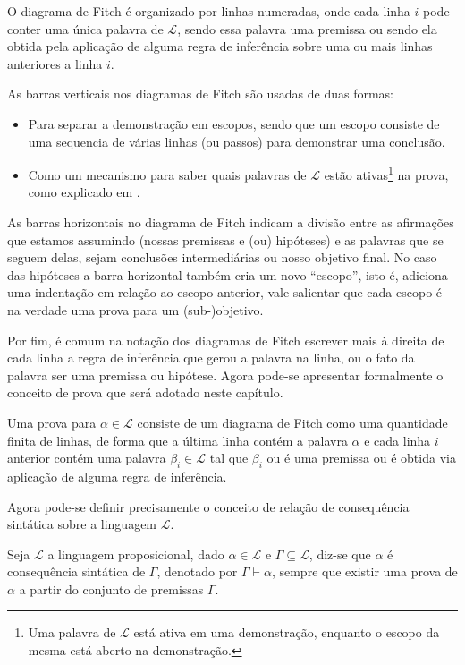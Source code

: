 O diagrama de Fitch é organizado por linhas numeradas, onde cada linha $i$ pode conter uma única palavra de $\mathcal{L}$, sendo essa palavra uma premissa ou sendo ela obtida pela aplicação de alguma regra de inferência sobre uma ou mais linhas anteriores a linha $i$. 

As barras verticais nos diagramas de Fitch são usadas de duas formas:
\begin{itemize}
    \item[(1)] Para separar a demonstração em escopos, sendo que um escopo consiste de uma sequencia de várias linhas (ou passos) para demonstrar uma conclusão.
    \item[(2)] Como um mecanismo para saber quais palavras de $\mathcal{L}$ estão ativas\footnote{Uma palavra de $\mathcal{L}$ está ativa em uma demonstração, enquanto o escopo da mesma está aberto na demonstração.} na prova, como explicado em \cite{joaoPavao2014}. 
\end{itemize}

As barras horizontais no diagrama de Fitch indicam a divisão entre  as  afirmações  que  estamos  assumindo  (nossas premissas e (ou) hipóteses) e as palavras que se seguem delas, sejam conclusões intermediárias ou nosso objetivo final. No caso das hipóteses a barra horizontal também cria um novo ``escopo'', isto é, adiciona uma indentação em relação ao escopo anterior, vale salientar que cada escopo é na verdade uma prova para um (sub-)objetivo. 

Por fim, é comum na notação dos diagramas de Fitch escrever mais à direita de cada linha a regra de inferência que gerou a palavra na linha, ou o fato da palavra ser uma premissa ou hipótese. Agora pode-se apresentar formalmente o conceito de prova que será adotado neste capítulo.

\begin{definicao}[Prova]\label{def:Prova}
  Uma prova para $\alpha \in \mathcal{L}$ consiste de um diagrama de Fitch como uma quantidade finita de linhas, de forma que a última linha contém a palavra $\alpha$ e cada linha $i$ anterior contém uma palavra $\beta_i \in \mathcal{L}$ tal que $\beta_i$ ou é uma premissa ou é obtida via aplicação de alguma regra de inferência.
\end{definicao}

Agora pode-se definir precisamente o conceito de relação de consequência sintática sobre a linguagem $\mathcal{L}$.

\begin{definicao}\label{def:ConsequenciaSintatica}
  Seja $\mathcal{L}$ a linguagem proposicional, dado $\alpha \in \mathcal{L}$ e $\Gamma \subseteq \mathcal{L}$, diz-se que $\alpha$ é consequência sintática de $\Gamma$, denotado por $\Gamma \vdash \alpha$, sempre que existir uma prova de $\alpha$ a partir do conjunto de premissas $\Gamma$. 
\end{definicao}

